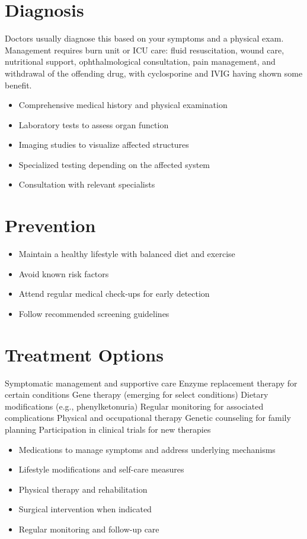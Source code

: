 \section{Diagnosis}
Doctors usually diagnose this based on your symptoms and a physical exam. Management requires burn unit or ICU care: fluid resuscitation, wound care, nutritional support, ophthalmological consultation, pain management, and withdrawal of the offending drug, with cyclosporine and IVIG having shown some benefit.

\begin{itemize}[noitemsep]
  \item Comprehensive medical history and physical examination
  \item Laboratory tests to assess organ function
  \item Imaging studies to visualize affected structures
  \item Specialized testing depending on the affected system
  \item Consultation with relevant specialists
\end{itemize}
\section{Prevention}
\begin{itemize}[noitemsep]
  \item Maintain a healthy lifestyle with balanced diet and exercise
  \item Avoid known risk factors
  \item Attend regular medical check-ups for early detection
  \item Follow recommended screening guidelines
\end{itemize}
\section{Treatment Options}
Symptomatic management and supportive care Enzyme replacement therapy for certain conditions Gene therapy (emerging for select conditions) Dietary modifications (e.g., phenylketonuria) Regular monitoring for associated complications Physical and occupational therapy Genetic counseling for family planning Participation in clinical trials for new therapies

\begin{itemize}[noitemsep]
  \item Medications to manage symptoms and address underlying mechanisms
  \item Lifestyle modifications and self-care measures
  \item Physical therapy and rehabilitation
  \item Surgical intervention when indicated
  \item Regular monitoring and follow-up care
\end{itemize}
